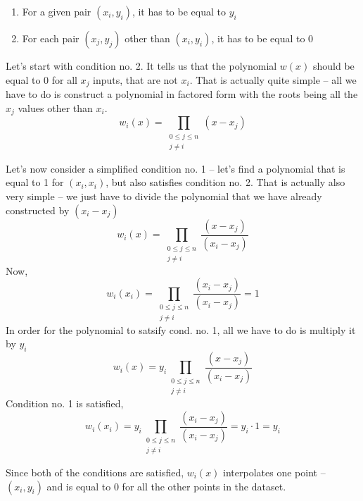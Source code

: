 \documentclass{MathematicaReport}
\begin{document}

\begin{enumerate}
	\item For a given pair \( (x_i, y_i) \), it has to be equal to \( y_i \) 
	\item For each pair \( (x_j, y_j) \) other than \( (x_i, y_i) \), it has to
	be equal to 0
\end{enumerate}

Let's start with condition no. 2. It tells us that the polynomial \( w(x) \)
should be equal to 0 for all \( x_j \) inputs, that are not \( x_i \). That is
actually quite simple -- all we have to do is construct a polynomial in
factored form with the roots being all the \( x_j \) values other than \( x_i \).
\[
	w_i(x) = \prod_{\begin{smallmatrix}0\le j\le n\\ j\neq i\end{smallmatrix}} (x-x_j)
\]

Let's now consider a simplified condition no. 1 -- let's find a polynomial that is
equal to 1 for \( (x_i, x_i) \), but also satisfies condition no. 2. That is
actually also very simple -- we just have to divide the polynomial that we have 
already constructed by \((x_i - x_j)\)
\[
	w_i(x) = \prod_{\begin{smallmatrix}0\le j\le n\\ j\neq i\end{smallmatrix}} \frac{(x - x_j)}{(x_i - x_j)}
\]
Now,
\[
	w_i(x_i) = \prod_{\begin{smallmatrix}0\le j\le n\\ j\neq i\end{smallmatrix}} \frac{(x_i - x_j)}{(x_i - x_j)} = 1
\]
In order for the polynomial to satsify cond. no. 1, all we have to do is 
multiply it by \( y_i \)
\[
	w_i(x) = y_i \prod_{\begin{smallmatrix}0\le j\le n\\ j\neq i\end{smallmatrix}} \frac{(x - x_j)}{(x_i - x_j)}
\]
Condition no. 1 is satisfied,
\[
	w_i(x_i) = y_i \prod_{\begin{smallmatrix}0\le j\le n\\ j\neq i\end{smallmatrix}} \frac{(x_i - x_j)}{(x_i - x_j)} = y_i \cdot 1 = y_i
\]

Since both of the conditions are satisfied, \( w_i(x) \) interpolates one point
-- \( (x_i, y_i) \) and is equal to 0 for all the other points in the dataset. 
\end{document}
